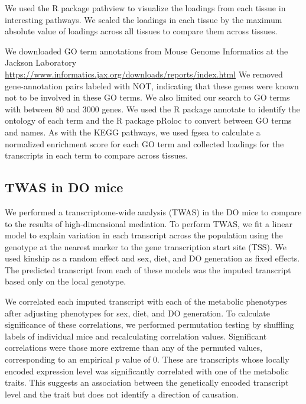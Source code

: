 \documentclass[
]{article}
\begin{document}
We used the R package pathview \cite{pmid23740750} to visualize the
loadings from each tissue in interesting pathways. We scaled the
loadings in each tissue by the maximum absolute value of loadings across
all tissues to compare them across tissues.

We downloaded GO term annotations from Mouse Genome Informatics at the
Jackson Laboratory \cite{pmid33231642}
\url{https://www.informatics.jax.org/downloads/reports/index.html} We
removed gene-annotation pairs labeled with NOT, indicating that these
genes were known not to be involved in these GO terms. We also limited
our search to GO terms with between 80 and 3000 genes. We used the R
package annotate \cite{R_annotate} to identify the ontology of each term
and the R package pRoloc \cite{pmid24413670} to convert between GO terms
and names. As with the KEGG pathways, we used fgsea to calculate a
normalized enrichment score for each GO term and collected loadings for
the transcripts in each term to compare across tissues.

\subsection{TWAS in DO mice}\label{twas-in-do-mice}

We performed a transcriptome-wide analysis (TWAS) \cite{pmid26258848, 
pmid26854917} in the DO mice to compare to the results of
high-dimensional mediation. To perform TWAS, we fit a linear model to
explain variation in each transcript across the population using the
genotype at the nearest marker to the gene transcription start site
(TSS). We used kinship as a random effect and sex, diet, and DO
generation as fixed effects. The predicted transcript from each of these
models was the imputed transcript based only on the local genotype.

We correlated each imputed transcript with each of the metabolic
phenotypes after adjusting phenotypes for sex, diet, and DO generation.
To calculate significance of these correlations, we performed
permutation testing by shuffling labels of individual mice and
recalculating correlation values. Significant correlations were those
more extreme than any of the permuted values, corresponding to an
empirical \(p\) value of 0. These are transcripts whose locally encoded
expression level was significantly correlated with one of the metabolic
traits. This suggests an association between the genetically encoded
transcript level and the trait but does not identify a direction of
causation.
\end{document}
